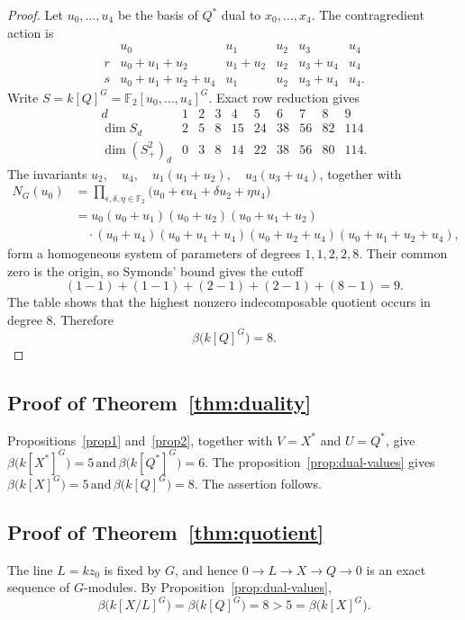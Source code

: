 \documentclass[11pt]{article}
\theoremstyle{definition}
\begin{document}
\begin{proof}
		Let $u_0,\ldots,u_4$ be the basis of $Q^*$ dual to $x_0,\ldots,x_4$. The contragredient action is
		\[
		\begin{array}{c|ccccc}
			&u_0&u_1&u_2&u_3&u_4\\ \hline
			r&u_0+u_1+u_2&u_1+u_2&u_2&u_3+u_4&u_4\\[1mm]
			s&u_0+u_1+u_2+u_4&u_1&u_2&u_3+u_4&u_4.
		\end{array}
		\]
		Write $S=k[Q]^G=\mathbb F_2[u_0,\ldots,u_4]^G$. Exact row reduction gives
		\[
		\begin{array}{c|rrrrrrrrr}
			d&1&2&3&4&5&6&7&8&9\\ \hline
			\dim S_d&2&5&8&15&24&38&56&82&114\\
			\dim(S_+^2)_d&0&3&8&14&22&38&56&80&114.
		\end{array}
		\]
		The invariants $u_2,\quad u_4,\quad u_1(u_1+u_2),\quad u_3(u_3+u_4)$, together with
		\[
		\begin{aligned}
		N_G(u_0)
		&=\prod_{\epsilon,\delta,\eta\in\mathbb F_2}
		\bigl(u_0+\epsilon u_1+\delta u_2+\eta u_4\bigr)\\
		&=u_0(u_0+u_1)(u_0+u_2)(u_0+u_1+u_2)\\
		&\quad\cdot(u_0+u_4)(u_0+u_1+u_4)
		(u_0+u_2+u_4)(u_0+u_1+u_2+u_4),
		\end{aligned}
		\]
		form a homogeneous system of parameters of degrees $1,1,2,2,8$. Their common zero is the origin, so Symonds' bound gives the cutoff
		\[
		(1-1)+(1-1)+(2-1)+(2-1)+(8-1)=9.
		\]
		The table shows that the highest nonzero indecomposable quotient occurs in degree $8$. Therefore
		\[
		\beta\bigl(k[Q]^G\bigr)=8.
		\]
	\end{proof}

	\subsection*{Proof of Theorem~\ref{thm:duality}}
	Propositions~\ref{prop1} and~\ref{prop2}, together with $V=X^*$ and $U=Q^*$, give $\beta\bigl(k[X^*]^G\bigr)=5 \, \text{and}\,
	\beta\bigl(k[Q^*]^G\bigr)=6$. The proposition~\ref{prop:dual-values} gives $\beta\bigl(k[X]^G\bigr)=5 \,\text{and} \, \beta\bigl(k[Q]^G\bigr)=8$.	The assertion follows.

	\subsection*{Proof of Theorem~\ref{thm:quotient}}
	The line $L=kz_0$ is fixed by $G$, and hence $0\longrightarrow L\longrightarrow X\longrightarrow Q\longrightarrow0$ is an exact sequence of $G$-modules. By Proposition~\ref{prop:dual-values},
	\[
	\beta\bigl(k[X/L]^G\bigr)
	=\beta\bigl(k[Q]^G\bigr)
	=8>5
	=\beta\bigl(k[X]^G\bigr).
	\]
\end{document}
